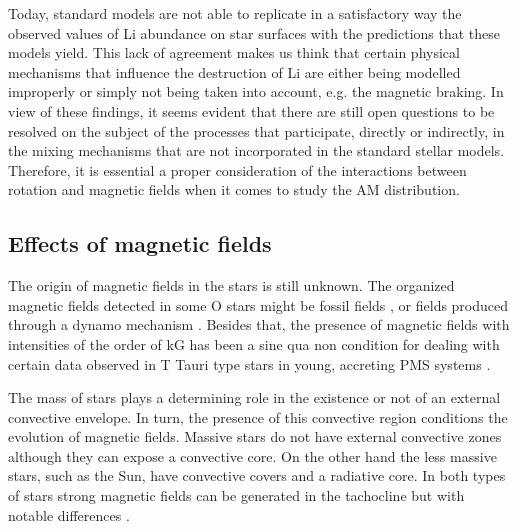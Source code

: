 \documentclass[fleqn,usenatbib]{mnras}
\begin{document}
Today, standard models are not able to replicate in a satisfactory way the observed values of Li abundance on star surfaces with the predictions that these models yield. This lack of agreement makes us think that certain physical mechanisms that influence the destruction of Li are either being modelled improperly or simply not being taken into account, e.g. the magnetic braking. In view of these findings, it seems evident that there are still open questions to be resolved on the subject of the processes that participate, directly or indirectly, in the mixing mechanisms that are not incorporated in the standard stellar models. Therefore, it is essential a proper consideration of the interactions between rotation and magnetic fields when it comes to study the AM distribution. \par

\subsection{Effects of magnetic fields}
The origin of magnetic fields in the stars is still unknown. The organized magnetic fields detected in some O stars \citep{Wade2010} might be fossil fields \citep[see][for details ]{Dudorov2014}, or fields produced through a dynamo mechanism \citep{Cantiello2009}. Besides that, the presence of magnetic fields with intensities of the order of kG \citep{Hussain2014} has been a sine qua non condition for dealing with certain data observed in T Tauri type stars in young, accreting PMS systems \citep{Johns-Krull2007}.\par

The mass of stars plays a determining role in the existence or not of an external convective envelope. In turn, the presence of this convective region conditions the evolution of magnetic fields. Massive stars do not have external convective zones although they can expose a convective core. On the other hand the less massive stars, such as the Sun, have convective covers and a radiative core. In both types of stars strong magnetic fields can be generated in the tachocline but with notable differences \citep[e.g.][for details]{Chabrier2006,Charbonneau2010}.\par
\end{document}
